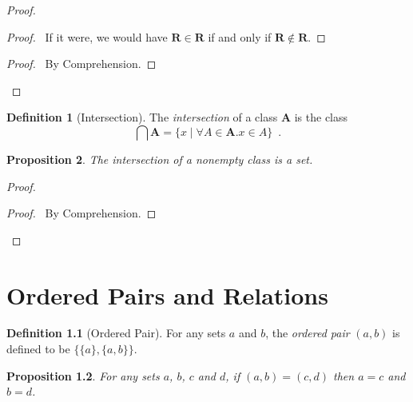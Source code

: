 \documentclass{book}
\let\qed\relax
\newtheorem{prop}{Proposition}[chapter]
\theoremstyle{definition}
\newtheorem{df}[prop]{Definition}
\begin{document}
\begin{proof}
    \pf
    \begin{proof}
        \pf\ If it were, we would have $\mathbf{R} \in \mathbf{R}$ if and only if $\mathbf{R} \notin \mathbf{R}$.
    \end{proof}
    \begin{proof}
        \pf\ By Comprehension.
    \end{proof}
    \qed
\end{proof}

\begin{df}[Intersection]
    The \emph{intersection} of a class $\mathbf{A}$ is the class
    \[ \bigcap \mathbf{A} = \{ x \mid \forall A \in \mathbf{A}. x \in A\} \enspace . \]
\end{df}

\begin{prop}
    The intersection of a nonempty class is a set.
\end{prop}

\begin{proof}
    \pf
    \begin{proof}
        \pf\ By Comprehension.
    \end{proof}
    \qed
\end{proof}

\chapter{Ordered Pairs and Relations}

\begin{df}[Ordered Pair]
    For any sets $a$ and $b$, the \emph{ordered pair} $(a,b)$ is defined to be $\{ \{ a \}, \{ a,b\}\}$.
\end{df}

\begin{prop}
    For any sets $a$, $b$, $c$ and $d$, if $(a,b) = (c,d)$ then $a = c$ and $b = d$.
\end{prop}
\end{document}
